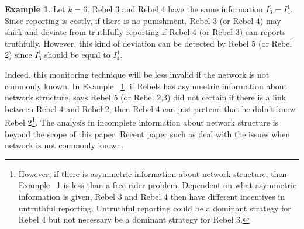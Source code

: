 \documentclass[12pt,letter]{article}
\theoremstyle{definition}
\newtheorem{example}{Example}[section]
\theoremstyle{remark}
\theoremstyle{claim}
\begin{document}
\begin{example}
\label{ex_no_free_rider_circle}
Let $k=6$. Rebel 3 and Rebel 4 have the same information $I^1_3=I^1_4$. Since reporting is costly, if there is no punishment, Rebel 3 (or Rebel 4) may shirk and deviate from truthfully reporting if Rebel 4 (or Rebel 3) can reports truthfully. However, this kind of deviation can be detected by Rebel 5 (or Rebel 2) since $I^1_3$ should be equal to $I^1_4$. 

\begin{center}
\end{center}

\end{example}

Indeed, this monitoring technique will be less invalid if the network is not commonly known. In Example ~\ref{ex_no_free_rider_circle}, if Rebels has asymmetric information about network structure, says Rebel 5 (or Rebel 2,3) did not certain if there is a link between Rebel 4 and Rebel 2, then Rebel 4 can just pretend that he didn't know Rebel 2\footnote{However, if there is asymmetric information about network structure, then Example ~\ref{ex_no_free_rider_circle} is less than a free rider problem. Dependent on what asymmetric information is given, Rebel 3 and Rebel 4 then have different incentives in untruthful reporting. Untruthful reporting could be a dominant strategy for Rebel 4 but not necessary be a dominant strategy for Rebel 3.}. The analysis in incomplete information about network structure is beyond the scope of this paper. Recent paper such as \citep{Galeotti2010} deal with the issues when network is not commonly known.
\end{document}
